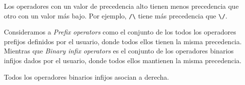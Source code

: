 \documentclass[a4paper,11pt]{article}
\theoremstyle{definition}
\theoremstyle{remark}
\begin{document}
Los operadores con un valor de precedencia alto tienen menos precedencia que otro con un valor más bajo.
Por ejemplo, \texttt{/\textbackslash} tiene más precedencia que \texttt{\textbackslash/}.

Consideramos a \textit{Prefix operators} como el conjunto de los todos los operadores prefijos definidos por el usuario,
donde todos ellos tienen la misma precedencia.
Mientras que \textit{Binary infix operators} es el conjunto de los operadores binarios infijos dados por el usuario,
donde todos ellos mantienen la misma precedencia.

Todos los operadores binarios infijos asocian a derecha.


  


\end{document}
